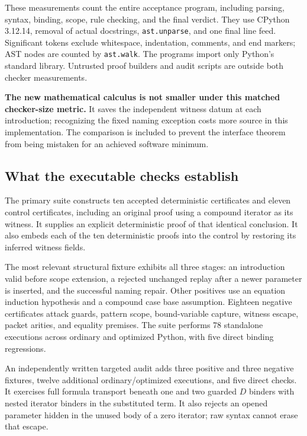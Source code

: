 These measurements count the entire acceptance program, including parsing,
syntax, binding, scope, rule checking, and the final verdict. They use
CPython 3.12.14, removal of actual docstrings, \texttt{ast.unparse}, and one
final line feed. Significant tokens exclude whitespace, indentation,
comments, and end markers; AST nodes are counted by \texttt{ast.walk}.
The programs import only Python's standard library. Untrusted proof builders
and audit scripts are outside both checker measurements.

\textbf{The new mathematical calculus is not smaller under this matched
checker-size metric.} It saves the independent witness datum at each
introduction; recognizing the fixed naming exception costs more source in
this implementation. The comparison is included to prevent the interface
theorem from being mistaken for an achieved software minimum.

\subsection{What the executable checks establish}

The primary suite constructs ten accepted deterministic certificates and
eleven control certificates, including an original proof using a compound
iterator as its witness. It supplies an explicit deterministic proof of
that identical conclusion. It also embeds each of the ten deterministic
proofs into the control by restoring its inferred witness fields.

The most relevant structural fixture exhibits all three stages:
an introduction valid before scope extension, a rejected unchanged replay
after a newer parameter is inserted, and the successful naming repair.
Other positives use an equation induction hypothesis and a compound case
base assumption. Eighteen negative certificates attack guards, pattern
scope, bound-variable capture, witness escape, packet arities, and equality
premises. The suite performs 78 standalone executions across ordinary and
optimized Python, with five direct binding regressions.

An independently written targeted audit adds three positive and three negative
fixtures, twelve additional ordinary/optimized executions, and five direct
checks. It exercises full formula transport beneath one and two guarded
$D$ binders with nested iterator binders in the substituted term. It also
rejects an opened parameter hidden in the unused body of a zero iterator;
raw syntax cannot erase that escape.

